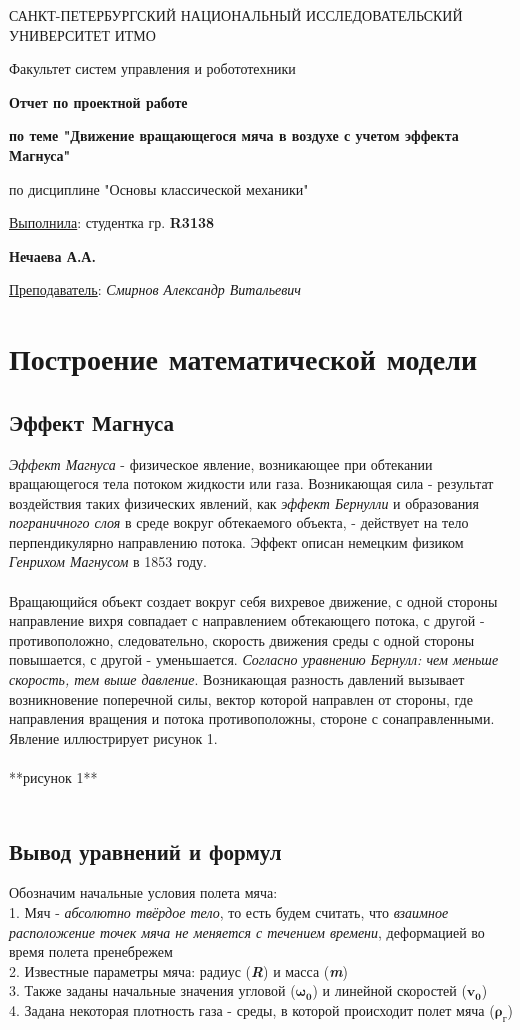 \documentclass[a5paper, 10pt]{article}
\theoremstyle{definition}
\theoremstyle{plain}
\theoremstyle{remark}
\newcommand*{\titlePage}{
	\thispagestyle{title}
	\begingroup
	\begin{center}
		\vspace*{6ex}
		
		{\small
			САНКТ-ПЕТЕРБУРГСКИЙ НАЦИОНАЛЬНЫЙ ИССЛЕДОВАТЕЛЬСКИЙ УНИВЕРСИТЕТ ИТМО	
		}
		
		\vspace*{2ex}
		
		{\normalsize
			Факультет систем управления и робототехники
		}
		
		\vspace*{15ex}
		
		{\Large \bfseries 
			Отчет по проектной работе
		}
\vspace*{2ex}
		
		{\Large \bfseries 
			по теме "Движение вращающегося мяча в воздухе с учетом эффекта Магнуса"
		}
\vspace*{2ex}
		
		{\Large
			по дисциплине "Основы классической механики"
		}

	\end{center}
	\vspace*{20ex}
	\begin{flushright}
		{\large 
			\underline{Выполнила}: студентка гр. \textbf{R3138}\\
			\begin{flushright}
				\textbf{Нечаева А.А.}\\
			\end{flushright}
		}
		
		\vspace*{5ex}
		
		{\large 
			\underline{Преподаватель}: \textit{Смирнов Александр Витальевич}
		}
	\end{flushright}	
	\newpage
	\setcounter{page}{2}
	\endgroup}
\begin{document}
	\titlePage
	\pagestyle{style}
\newpage
\section{Построение математической модели}
\subsection{Эффект Магнуса}
\textit{Эффект Магнуса} - физическое явление, возникающее при обтекании вращающегося тела потоком жидкости или газа. Возникающая сила - результат воздействия таких физических явлений, как \textit{эффект Бернулли} и образования \textit{пограничного слоя} в среде вокруг обтекаемого объекта, - действует на тело перпендикулярно направлению потока. Эффект описан немецким физиком \textit{Генрихом Магнусом} в 1853 году. \\\\
Вращающийся объект создает вокруг себя вихревое движение, с одной стороны направление вихря совпадает с направлением обтекающего потока, с другой - противоположно, следовательно, скорость движения среды с одной стороны повышается, с другой - уменьшается. \textit{Согласно уравнению Бернулл: чем меньше скорость, тем выше давление}. Возникающая разность давлений вызывает возникновение поперечной силы, вектор которой направлен от стороны, где направления вращения и потока противоположны, стороне с сонаправленными. Явление иллюстрирует рисунок 1.
\\\\
**рисунок 1**
\\\\
\subsection{Вывод уравнений и формул}	
Обозначим начальные условия полета мяча:\\
1. Мяч - \textit{абсолютно твёрдое тело}, то есть будем считать, что \textit{взаимное расположение точек мяча не меняется с течением времени}, деформацией во время полета пренебрежем\\
2. Известные параметры мяча: радиус (\textit{\textbf{R}}) и масса (\textit{\textbf{m}})\\
3. Также заданы начальные значения угловой ($\mathbf{\omega_{0}}$) и линейной скоростей ($\mathbf{v_{0}}$)\\
4. Задана некоторая плотность газа - среды, в которой происходит полет мяча ($\mathbf{\rho_{\text{г}}}$)\\\\
\end{document}
